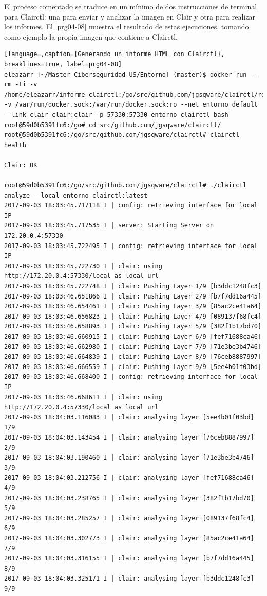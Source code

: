 El proceso comentado se traduce en un mínimo de dos instrucciones de terminal para Clairctl: una para enviar y analizar la imagen en Clair y otra para realizar los informes. El \autoref{prg04-08} muestra el resultado de estas ejecuciones, tomando como ejemplo la propia imagen que contiene a Clairctl.

\begin{lstlisting}[language=,caption={Generando un informe HTML con Clairctl}, breaklines=true, label=prg04-08]
eleazarr [~/Master_Ciberseguridad_US/Entorno] (master)$ docker run --rm -ti -v /home/eleazarr/informe_clairctl:/go/src/github.com/jgsqware/clairctl/reports -v /var/run/docker.sock:/var/run/docker.sock:ro --net entorno_default --link clair_clair:clair -p 57330:57330 entorno_clairctl bash
root@59d0b5391fc6:/go# cd src/github.com/jgsqware/clairctl/
root@59d0b5391fc6:/go/src/github.com/jgsqware/clairctl# clairctl health

Clair: OK

root@59d0b5391fc6:/go/src/github.com/jgsqware/clairctl# ./clairctl analyze --local entorno_clairctl:latest
2017-09-03 18:03:45.717118 I | config: retrieving interface for local IP
2017-09-03 18:03:45.717535 I | server: Starting Server on 172.20.0.4:57330
2017-09-03 18:03:45.722495 I | config: retrieving interface for local IP
2017-09-03 18:03:45.722730 I | clair: using http://172.20.0.4:57330/local as local url
2017-09-03 18:03:45.722748 I | clair: Pushing Layer 1/9 [b3ddc1248fc3]
2017-09-03 18:03:46.651866 I | clair: Pushing Layer 2/9 [b7f7dd16a445]
2017-09-03 18:03:46.654461 I | clair: Pushing Layer 3/9 [85ac2ce41a64]
2017-09-03 18:03:46.656823 I | clair: Pushing Layer 4/9 [089137f68fc4]
2017-09-03 18:03:46.658893 I | clair: Pushing Layer 5/9 [382f1b17bd70]
2017-09-03 18:03:46.660915 I | clair: Pushing Layer 6/9 [fef71688ca46]
2017-09-03 18:03:46.662980 I | clair: Pushing Layer 7/9 [71e3be3b4746]
2017-09-03 18:03:46.664839 I | clair: Pushing Layer 8/9 [76ceb8887997]
2017-09-03 18:03:46.666559 I | clair: Pushing Layer 9/9 [5ee4b01f03bd]
2017-09-03 18:03:46.668400 I | config: retrieving interface for local IP
2017-09-03 18:03:46.668611 I | clair: using http://172.20.0.4:57330/local as local url
2017-09-03 18:04:03.116083 I | clair: analysing layer [5ee4b01f03bd] 1/9
2017-09-03 18:04:03.143454 I | clair: analysing layer [76ceb8887997] 2/9
2017-09-03 18:04:03.190460 I | clair: analysing layer [71e3be3b4746] 3/9
2017-09-03 18:04:03.212756 I | clair: analysing layer [fef71688ca46] 4/9
2017-09-03 18:04:03.238765 I | clair: analysing layer [382f1b17bd70] 5/9
2017-09-03 18:04:03.285257 I | clair: analysing layer [089137f68fc4] 6/9
2017-09-03 18:04:03.302773 I | clair: analysing layer [85ac2ce41a64] 7/9
2017-09-03 18:04:03.316155 I | clair: analysing layer [b7f7dd16a445] 8/9
2017-09-03 18:04:03.325171 I | clair: analysing layer [b3ddc1248fc3] 9/9


\end{lstlisting}
